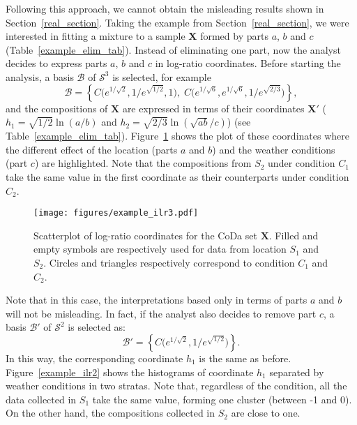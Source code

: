 \documentclass[12pt, a4paper]{article}
\theoremstyle{definition}
\begin{document}
Following this approach, we cannot obtain the misleading results shown in Section~\ref{real_section}. Taking the example from Section~\ref{real_section}, we were interested in fitting a mixture to a sample $\mathbf{X}$ formed by parts $a$, $b$ and $c$ (Table~\ref{example_elim_tab}). Instead of eliminating one part, now the analyst decides to express parts $a$, $b$ and $c$ in log-ratio coordinates. Before starting the analysis, a basis $\mathcal{B}$ of $\mathcal{S}^3$ is selected, for example
\begin{equation}\label{basis3}
\mathcal{B} = \left\{ C\Big( e^{1/\sqrt{2}}, 1/e^{\sqrt{1/2}}, 1 \Big), \; C\Big( e^{1/\sqrt{6}}, e^{1/\sqrt{6}}, 1/e^{\sqrt{2/3}} \Big) \right\},
\end{equation}
and the compositions of $\mathbf{X}$ are expressed in terms of their coordinates  $\mathbf{X}'$ ($h_1 = \sqrt{1/2} \ln(a/b)$ and $h_2 = \sqrt{2/3} \ln(\sqrt{ab} / c)$) (see Table~\ref{example_elim_tab}). Figure~\ref{example_ilr3} shows the plot of these coordinates where the different effect of the location (parts $a$ and $b$) and the weather conditions (part $c$) are highlighted. Note that the compositions from $S_2$ under condition $C_1$ take the same value in the first coordinate as their counterparts under condition $C_2$. 

\begin{figure}[thbp]
\centering
\texttt{[image: figures/example\_ilr3.pdf]}
\caption{Scatterplot of log-ratio coordinates for the CoDa set $\mathbf{X}$. Filled and empty symbols are respectively used for data from location $S_1$ and $S_2$. Circles and triangles respectively correspond to condition $C_1$ and $C_2$.}\label{example_ilr3}
\end{figure}

Note that in this case, the interpretations based only in terms of parts $a$ and $b$ will not be misleading. In fact, if the analyst also decides to remove part $c$, a basis $\mathcal{B}'$ of $\mathcal{S}^2$ is selected as:
\[
\mathcal{B}' = \left\{ C\Big( e^{1/\sqrt{2}}, 1/e^{\sqrt{1/2}} \Big) \right\}.
\]
In this way, the corresponding coordinate $h_1$ is the same as before. Figure~\ref{example_ilr2} 
shows the histograms of coordinate $h_1$ separated by weather conditions in two stratas. Note that, regardless of the condition, all the data collected in $S_1$ take the same value, forming one cluster (between -1 and 0). On the other hand, the compositions collected in $S_2$ are close to one.
\end{document}
